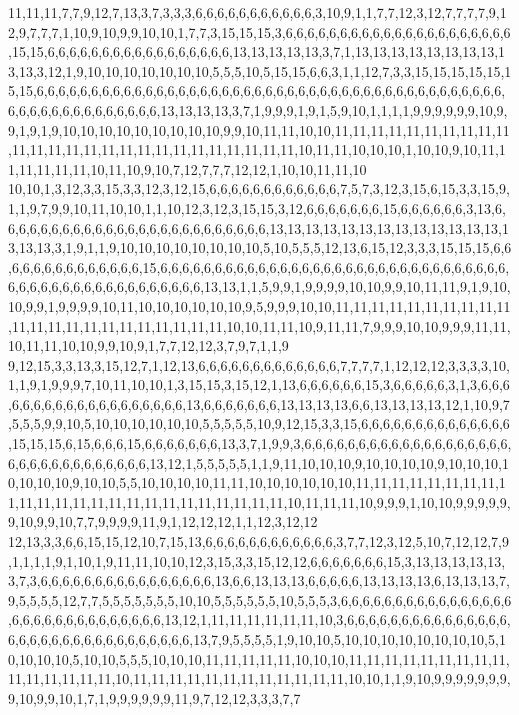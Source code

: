 11,11,11,7,7,9,12,7,13,3,7,3,3,3,6,6,6,6,6,6,6,6,6,6,6,3,10,9,1,1,7,7,12,3,12,7,7,7,7,9,12,9,7,7,7,1,10,9,10,9,9,10,10,1,7,7,3,15,15,15,3,6,6,6,6,6,6,6,6,6,6,6,6,6,6,6,6,6,6,6,6,6,15,15,6,6,6,6,6,6,6,6,6,6,6,6,6,6,6,6,6,13,13,13,13,13,3,7,1,13,13,13,13,13,13,13,13,13,13,3,12,1,9,10,10,10,10,10,10,10,5,5,5,10,5,15,15,6,6,3,1,1,12,7,3,3,15,15,15,15,15,15,15,6,6,6,6,6,6,6,6,6,6,6,6,6,6,6,6,6,6,6,6,6,6,6,6,6,6,6,6,6,6,6,6,6,6,6,6,6,6,6,6,6,6,6,6,6,6,6,6,6,6,6,6,6,6,6,6,6,13,13,13,13,3,7,1,9,9,9,1,9,1,5,9,10,1,1,1,1,9,9,9,9,9,9,10,9,9,1,9,1,9,10,10,10,10,10,10,10,10,10,9,9,10,11,11,10,10,11,11,11,11,11,11,11,11,11,11,11,11,11,11,11,11,11,11,11,11,11,11,11,11,11,11,10,11,11,10,10,10,1,10,10,9,10,11,11,11,11,11,11,10,11,10,9,10,7,12,7,7,7,12,12,1,10,10,11,11,10
10,10,1,3,12,3,3,15,3,3,12,3,12,15,6,6,6,6,6,6,6,6,6,6,6,6,7,5,7,3,12,3,15,6,15,3,3,15,9,1,1,9,7,9,9,10,11,10,10,1,1,10,12,3,12,3,15,15,3,12,6,6,6,6,6,6,6,15,6,6,6,6,6,6,3,13,6,6,6,6,6,6,6,6,6,6,6,6,6,6,6,6,6,6,6,6,6,6,6,6,6,13,13,13,13,13,13,13,13,13,13,13,13,13,13,13,13,3,1,9,1,1,9,10,10,10,10,10,10,10,10,5,10,5,5,5,12,13,6,15,12,3,3,3,15,15,15,6,6,6,6,6,6,6,6,6,6,6,6,6,6,15,6,6,6,6,6,6,6,6,6,6,6,6,6,6,6,6,6,6,6,6,6,6,6,6,6,6,6,6,6,6,6,6,6,6,6,6,6,6,6,6,6,6,6,6,6,6,6,6,6,6,13,13,1,1,5,9,9,1,9,9,9,9,10,10,9,9,10,11,11,9,1,9,10,10,9,9,1,9,9,9,9,10,11,10,10,10,10,10,10,9,5,9,9,9,10,10,11,11,11,11,11,11,11,11,11,11,11,11,11,11,11,11,11,11,11,11,11,11,10,10,11,11,10,9,11,11,7,9,9,9,10,10,9,9,9,11,11,10,11,11,10,10,9,9,10,9,1,7,7,12,12,3,7,9,7,1,1,9
9,12,15,3,3,13,3,15,12,7,1,12,13,6,6,6,6,6,6,6,6,6,6,6,6,6,7,7,7,7,1,12,12,12,3,3,3,3,10,1,1,9,1,9,9,9,7,10,11,10,10,1,3,15,15,3,15,12,1,13,6,6,6,6,6,6,15,3,6,6,6,6,6,3,1,3,6,6,6,6,6,6,6,6,6,6,6,6,6,6,6,6,6,6,6,13,6,6,6,6,6,6,6,13,13,13,13,6,6,13,13,13,13,12,1,10,9,7,5,5,5,9,9,10,5,10,10,10,10,10,10,5,5,5,5,5,10,9,12,15,3,3,15,6,6,6,6,6,6,6,6,6,6,6,6,6,6,15,15,15,6,15,6,6,6,15,6,6,6,6,6,6,6,13,3,7,1,9,9,3,6,6,6,6,6,6,6,6,6,6,6,6,6,6,6,6,6,6,6,6,6,6,6,6,6,6,6,6,6,6,6,6,13,12,1,5,5,5,5,5,1,1,9,11,10,10,10,9,10,10,10,10,9,10,10,10,10,10,10,10,9,10,10,5,5,10,10,10,10,11,11,10,10,10,10,10,10,11,11,11,11,11,11,11,11,11,11,11,11,11,11,11,11,11,11,11,11,11,11,11,11,10,11,11,11,10,9,9,9,1,10,10,9,9,9,9,9,9,10,9,9,10,7,7,9,9,9,9,11,9,1,12,12,12,1,1,12,3,12,12
12,13,3,3,6,6,15,15,12,10,7,15,13,6,6,6,6,6,6,6,6,6,6,6,6,3,7,7,12,3,12,5,10,7,12,12,7,9,1,1,1,1,9,1,10,1,9,11,11,10,10,12,3,15,3,3,15,12,12,6,6,6,6,6,6,6,15,3,13,13,13,13,13,3,7,3,6,6,6,6,6,6,6,6,6,6,6,6,6,6,6,6,13,6,6,13,13,13,6,6,6,6,6,13,13,13,13,6,13,13,13,7,9,5,5,5,5,12,7,7,5,5,5,5,5,5,5,10,10,5,5,5,5,5,5,10,5,5,5,3,6,6,6,6,6,6,6,6,6,6,6,6,6,6,6,6,6,6,6,6,6,6,6,6,6,6,6,6,6,6,13,12,1,11,11,11,11,11,11,10,3,6,6,6,6,6,6,6,6,6,6,6,6,6,6,6,6,6,6,6,6,6,6,6,6,6,6,6,6,6,6,6,6,13,7,9,5,5,5,5,1,9,10,10,5,10,10,10,10,10,10,10,10,5,10,10,10,10,5,10,10,5,5,5,10,10,10,11,11,11,11,11,10,10,10,11,11,11,11,11,11,11,11,11,11,11,11,11,11,11,10,11,11,11,11,11,11,11,11,11,11,11,11,10,10,1,1,9,10,9,9,9,9,9,9,9,9,10,9,9,10,1,7,1,9,9,9,9,9,9,11,9,7,12,12,3,3,3,7,7
